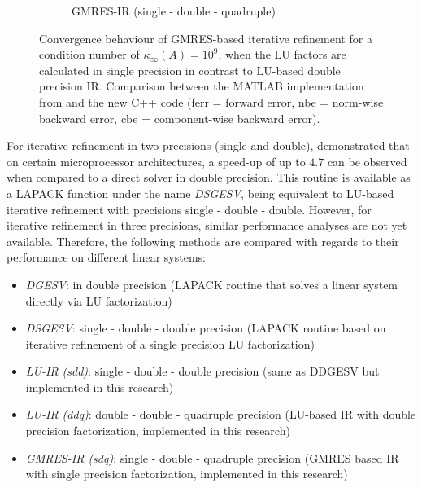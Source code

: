 \begin{figure}[h]
\begin{subfigure}{.5\textwidth}
  \caption{GMRES-IR (single - double - quadruple)}
  \label{fig:gmressdq}
\end{subfigure}
\caption[GMRES based IR in 3 Precisions]{Convergence behaviour of GMRES-based iterative refinement for a condition number of $\kappa_\infty (A)=10^9$, when the LU factors are calculated in single precision in contrast to LU-based double precision IR. Comparison between the MATLAB implementation from \cite{carson_new_2017} and the new C++ code (ferr = forward error, nbe = norm-wise backward error, cbe = component-wise backward error).}
\label{fig:gmres_ir3}
\end{figure}

For iterative refinement in two precisions (single and double), \cite{langou_exploiting_2006} demonstrated that on certain microprocessor architectures, a speed-up of up to $4.7$ can be observed when compared to a direct solver in double precision. This routine is available as a LAPACK function under the name \textit{DSGESV}, being equivalent to LU-based iterative refinement with precisions single - double - double. However, for iterative refinement in three precisions, similar performance analyses are not yet available. Therefore, the following methods are compared with regards to their performance on different linear systems:
\begin{itemize}
    \item \textit{DGESV}: in double precision (LAPACK routine that solves a linear system directly via LU factorization)
    \item \textit{DSGESV}: single - double - double precision (LAPACK routine based on iterative refinement of a single precision LU factorization)
    \item \textit{LU-IR (sdd)}: single - double - double precision (same as DDGESV but implemented in this research)
    \item \textit{LU-IR (ddq)}: double - double - quadruple precision (LU-based IR with double precision factorization, implemented in this research)
    \item \textit{GMRES-IR (sdq)}: single - double - quadruple precision (GMRES based IR with single precision factorization, implemented in this research)
\end{itemize}

